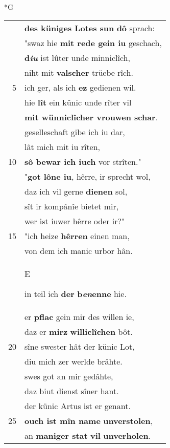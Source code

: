 \documentclass[8pt,a4paper,notitlepage]{article}
\begin{document}
\begin{table}[ht]
\begin{minipage}[t]{0.5\linewidth}
\small
\begin{center}*G
\end{center}
\begin{tabular}{rl}
 & \textbf{des küniges Lotes sun} \textbf{dô} sprach:\\ 
 & "swaz hie \textbf{mit rede gein iu} geschach,\\ 
 & \textbf{d\textit{iu}} ist lûter unde minniclîch,\\ 
 & niht mit \textbf{valscher} trüebe rîch.\\ 
5 & ich ger, als ich \textbf{ez} gedienen wil.\\ 
 & hie \textbf{lît} ein künic unde rîter vil\\ 
 & \textbf{mit wünniclîcher vrouwen schar}.\\ 
 & geselleschaft gibe ich iu dar,\\ 
 & lât mich mit iu rîten,\\ 
10 & \textbf{sô bewar ich iuch} vor strîten."\\ 
 & "\textbf{got lône iu}, hêrre, ir sprecht wol,\\ 
 & daz ich vil gerne \textbf{dienen} sol,\\ 
 & sît ir kompânîe bietet mir,\\ 
 & wer ist iuwer hêrre oder ir?"\\ 
15 & "ich heize \textbf{hêrren} einen man,\\ 
 & von dem ich manic urbor hân.\\ 
 & \begin{large}E\end{large}in teil ich \textbf{der} \textbf{b\textit{en}enne} hie.\\ 
 & er \textbf{pflac} gein mir des willen ie,\\ 
 & daz er \textbf{mirz} \textbf{williclîchen} bôt.\\ 
20 & sîne swester hât der künic Lot,\\ 
 & diu mich zer werlde brâhte.\\ 
 & swes got an mir gedâhte,\\ 
 & daz biut dienst sîner hant.\\ 
 & der künic Artus ist er genant.\\ 
25 & \textbf{ouch ist mîn name} \textbf{unverstolen},\\ 
 & an \textbf{maniger stat} \textbf{vil} \textbf{unverholen}.\\ 

\end{tabular}
\end{minipage}
\end{table}
\end{document}
